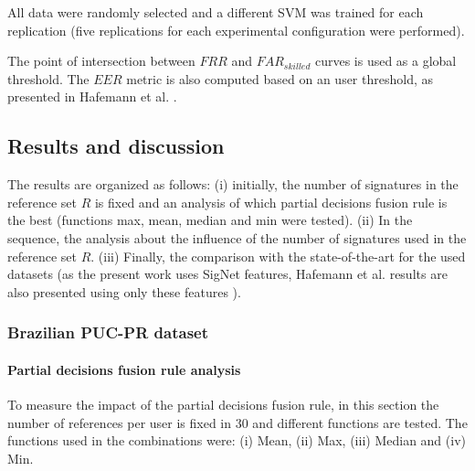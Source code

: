 \documentclass[conference]{IEEEtran}
\begin{document}
All data were randomly selected and a different SVM was trained for each replication (five replications for each experimental configuration were performed).

The point of intersection between $FRR$ and $FAR_{skilled}$ curves is used as a global threshold. The $EER$ metric is also computed based on an user threshold, as presented in Hafemann et al. \cite{hafemann:17}.



\subsection{Results and discussion}

The results are organized as follows: (i) initially, the number of signatures in the reference set $R$ is fixed and an analysis of which partial decisions fusion rule is the best (functions max, mean, median and min were tested). (ii) In the sequence, the analysis about the influence of the number of signatures used in the reference set $R$. (iii) Finally, the comparison with the state-of-the-art for the used datasets (as the present work uses SigNet features, Hafemann et al. results are also presented using only these features \cite{hafemann:17}).

\subsubsection{Brazilian PUC-PR dataset}

\paragraph{Partial decisions fusion rule analysis}
To measure the impact of the partial decisions fusion rule, in this section  the number of references per user is fixed in 30 and different functions are tested. The functions used in the combinations were: (i) Mean, (ii) Max, (iii) Median and (iv) Min.
\end{document}

